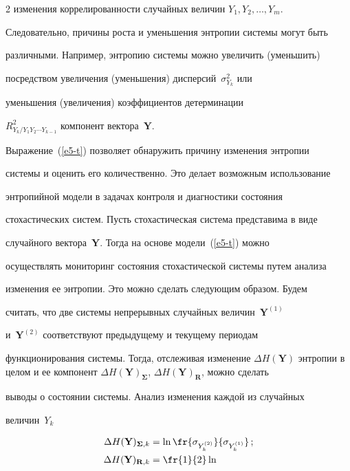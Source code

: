 \begin{multicols}{2}
изменения коррелированности случайных величин $Y_1,Y_2,\ldots , Y_m$. 

Следовательно, причины рос\-та и уменьшения энтропии сис\-те\-мы могут быть 

различными. Например, энтропию системы можно увеличить (уменьшить) 

посредством увеличения (уменьшения) дисперсий~$\sigma^2_{Y_k}$ или 

уменьшения (\mbox{увеличения}) коэффициентов детерминации 

$R^2_{Y_k/Y_1Y_2\cdots Y_{k-1}}$ компонент вектора~$\mathbf{Y}$.

  

  Выражение~(\ref{e5-t}) позволяет обнаружить причину изменения энтропии 

системы и оценить его количественно. Это делает возможным использование 

энтропийной модели в задачах контроля и диагностики состояния 

стохастических сист\-ем. Пусть стохастическая система представима в виде 

случайного вектора~$\mathbf{Y}$. Тогда на основе модели~(\ref{e5-t}) можно 

осуществлять мониторинг состояния стохастической системы путем анализа 

изменения ее энтропии. Это можно сделать следующим образом. Будем 

считать, что две системы непрерывных случайных величин~$\mathbf{Y}^{(1)}$ 

и~$\mathbf{Y}^{(2)}$ соответствуют предыдущему и текущему периодам 

функционирования системы. Тогда, отслеживая изменение $\Delta 

H(\mathbf{Y})$ энтропии в целом и ее компонент $\Delta 

H(\mathbf{Y})_{\boldsymbol{\Sigma}}$, $\Delta H(\mathbf{Y})_{\mathbf{R}}$, можно сделать 

выводы о состоянии системы. Анализ изменения каждой из случайных 

величин~$Y_k$

  \begin{align*}

  \Delta H(\mathbf{Y})_{\boldsymbol{\Sigma},k} &=\ln 

\fr{\sigma_{Y_k^{(2)}}}{\sigma_{Y_k^{(1)}}}\,;\\

  \Delta H(\mathbf{Y})_{\mathbf{R},k} &=\fr{1}{2}\ln 


\end{align*}
\end{multicols}
